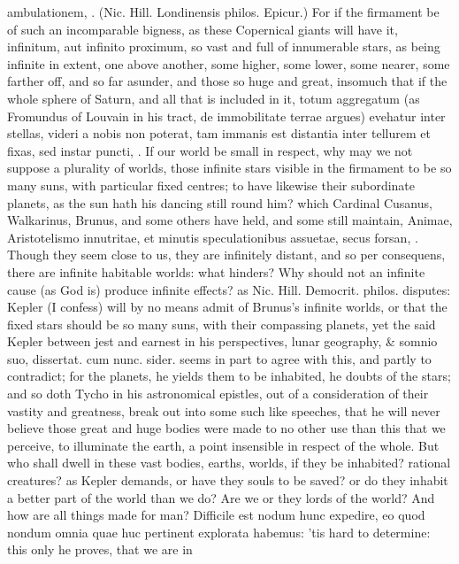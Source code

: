 {ambulationem, \etc{}. (Nic. Hill. Londinensis philos. Epicur.) For if the
firmament be of such an incomparable bigness, as these Copernical
giants will have it, infinitum, aut infinito proximum, so vast and full
of innumerable stars, as being infinite in extent, one above another,
some higher, some lower, some nearer, some farther off, and so far
asunder, and those so huge and great, insomuch that if the whole sphere
of Saturn, and all that is included in it, totum aggregatum (as
Fromundus of Louvain in his tract, de immobilitate terrae argues)
evehatur inter stellas, videri a nobis non poterat, tam immanis est
distantia inter tellurem et fixas, sed instar puncti, \etc{}. If our world
be small in respect, why may we not suppose a plurality of worlds,
those infinite stars visible in the firmament to be so many suns, with
particular fixed centres; to have likewise their subordinate planets,
as the sun hath his dancing still round him? which Cardinal Cusanus,
Walkarinus, Brunus, and some others have held, and some still maintain,
Animae, Aristotelismo innutritae, et minutis speculationibus assuetae,
secus forsan, \etc{}. Though they seem close to us, they are infinitely
distant, and so per consequens, there are infinite habitable worlds:
what hinders? Why should not an infinite cause (as God is) produce
infinite effects? as Nic. Hill. Democrit. philos. disputes: Kepler (I
confess) will by no means admit of Brunus's infinite worlds, or that
the fixed stars should be so many suns, with their compassing planets,
yet the said Kepler between jest and earnest in his perspectives,
lunar geography,  \& somnio suo, dissertat. cum nunc. sider. seems
in part to agree with this, and partly to contradict; for the planets,
he yields them to be inhabited, he doubts of the stars; and so doth
Tycho in his astronomical epistles, out of a consideration of their
vastity and greatness, break out into some such like speeches, that he
will never believe those great and huge bodies were made to no other
use than this that we perceive, to illuminate the earth, a point
insensible in respect of the whole. But who shall dwell in these vast
bodies, earths, worlds,  if they be inhabited? rational
creatures? as Kepler demands, or have they souls to be saved? or do
they inhabit a better part of the world than we do? Are we or they
lords of the world? And how are all things made for man? Difficile est
nodum hunc expedire, eo quod nondum omnia quae huc pertinent explorata
habemus: 'tis hard to determine: this only he proves, that we are in
}
